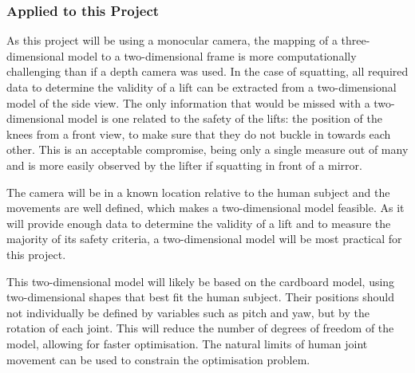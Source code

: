 \subsubsection{Applied to this Project}

As this project will be using a monocular camera, the mapping of a three-dimensional model to a two-dimensional frame is more computationally challenging than if a depth camera was used. In the case of squatting, all required data to determine the validity of a lift can be extracted from a two-dimensional model of the side view. The only information that would be missed with a two-dimensional model is one related to the safety of the lifts: the position of the knees from a front view, to make sure that they do not buckle in towards each other. This is an acceptable compromise, being only a single measure out of many and is more easily observed by the lifter if squatting in front of a mirror.

The camera will be in a known location relative to the human subject and the movements are well defined, which makes a two-dimensional model feasible. As it will provide enough data to determine the validity of a lift and to measure the majority of its safety criteria, a two-dimensional model will be most practical for this project.

This two-dimensional model will likely be based on the cardboard model, using two-dimensional shapes that best fit the human subject. Their positions should not individually be defined by variables such as pitch and yaw, but by the rotation of each joint. This will reduce the number of degrees of freedom of the model, allowing for faster optimisation. The natural limits of human joint movement can be used to constrain the optimisation problem.